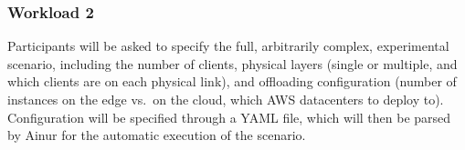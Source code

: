 \subsubsection{Workload 2}

Participants will be asked to specify the full, arbitrarily complex, experimental scenario, including the number of clients, physical layers (single or multiple, and which clients are on each physical link), and offloading configuration (number of instances on the edge vs.\ on the cloud, which \gls{AWS} datacenters to deploy to).
Configuration will be specified through a \acs{YAML} file, which will then be parsed by Ainur for the automatic execution of the scenario.